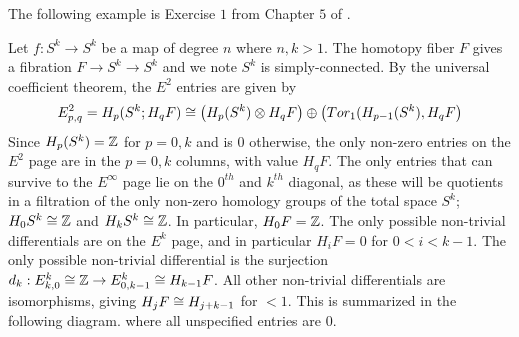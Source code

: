The following example is Exercise $1$ from Chapter $5$ of \cite{Hatcher-spec}.
\begin{example}
Let $f:S^k\rightarrow S^k$ be a map of degree $n$ where $n,k>1$. The homotopy fiber $F$ gives a fibration $F\rightarrow S^k\rightarrow S^k$ and we note $S^k$ is simply-connected. By the universal coefficient theorem, the $E^2$ entries are given by
$$E_{p,q}^2=H_p(S^k;H_qF)\cong \big(H_p(S^k)\otimes H_qF\big)\oplus\big(Tor_1(H_{p-1}(S^k),H_qF\big)$$
Since $H_p(S^k)=\mathbb{Z}$ for $p=0,k$ and is $0$ otherwise, the only non-zero entries on the $E^2$ page are in the $p=0,k$ columns, with value $H_qF$. The only entries that can survive to the $E^\infty$ page lie on the $0^{th}$ and $k^{th}$ diagonal, as these will be quotients in a filtration of the only non-zero homology groups of the total space $S^k$; $H_0S^k\cong \mathbb{Z}$ and $H_kS^k\cong \mathbb{Z}$. In particular, $H_0F=\mathbb{Z}$. The only possible non-trivial differentials are on the $E^k$ page, and in particular $H_iF=0$ for $0<i<k-1$. The only possible non-trivial differential is the surjection $d_k:E_{k,0}^k\cong \mathbb{Z}\rightarrow E^k_{0,k-1}\cong H_{k-1}F$. All other non-trivial differentials are isomorphisms, giving $H_jF\cong H_{j+k-1}$ for $<1$. This is summarized in the following diagram. where all unspecified entries are $0$.


\end{example}
